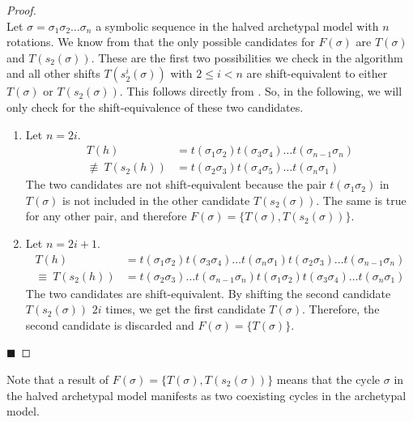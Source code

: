 \begin{proof} \phantom{x} \\
	Let $\sigma = \sigma_1\sigma_2 \dots \sigma_n$ a symbolic sequence in the halved archetypal model with $n$ rotations.
	We know from  that the only possible candidates for $F(\sigma)$ are $T(\sigma)$ and $T(s_2(\sigma))$.
	These are the first two possibilities we check in the algorithm and all other shifts $T(s_2^i(\sigma))$ with $2 \leq i < n$ are shift-equivalent to either $T(\sigma)$ or $T(s_2(\sigma))$.
	This follows directly from .
	So, in the following, we will only check for the shift-equivalence of these two candidates.
	\begin{enumerate}
		\item Let $n = 2i$.
		      \begin{align*}
			      T(h)                 & = t(\sigma_1\sigma_2) t(\sigma_3\sigma_4) \dots t(\sigma_{n-1}\sigma_n) \\
			      \nequiv \: T(s_2(h)) & = t(\sigma_2\sigma_3) t(\sigma_4\sigma_5) \dots t(\sigma_n\sigma_1)
		      \end{align*}
		      The two candidates are not shift-equivalent because the pair $t(\sigma_1\sigma_2)$ in $T(\sigma)$ is not included in the other candidate $T(s_2(\sigma))$.
		      The same is true for any other pair, and therefore $F(\sigma) = \{T(\sigma), T(s_2(\sigma))\}$.
		\item Let $n = 2i + 1$.
		      \begin{align*}
			      T(h)                & = t(\sigma_1\sigma_2) t(\sigma_3\sigma_4) \dots t(\sigma_n\sigma_1) t(\sigma_2\sigma_3) \dots t(\sigma_{n-1}\sigma_n) \\
			      \equiv \: T(s_2(h)) & = t(\sigma_2\sigma_3) \dots t(\sigma_{n-1}\sigma_n) t(\sigma_1\sigma_2) t(\sigma_3\sigma_4) \dots t(\sigma_n\sigma_1)
		      \end{align*}
		      The two candidates are shift-equivalent.
		      By shifting the second candidate $T(s_2(\sigma))$ $2i$ times, we get the first candidate $T(\sigma)$.
		      Therefore, the second candidate is discarded and $F(\sigma) = \{T(\sigma)\}$.
	\end{enumerate}
	\hfill $\blacksquare$
\end{proof}

Note that a result of $F(\sigma) = \{T(\sigma), T(s_2(\sigma))\}$ means that the cycle $\sigma$ in the halved archetypal model manifests as two coexisting cycles in the archetypal model.

